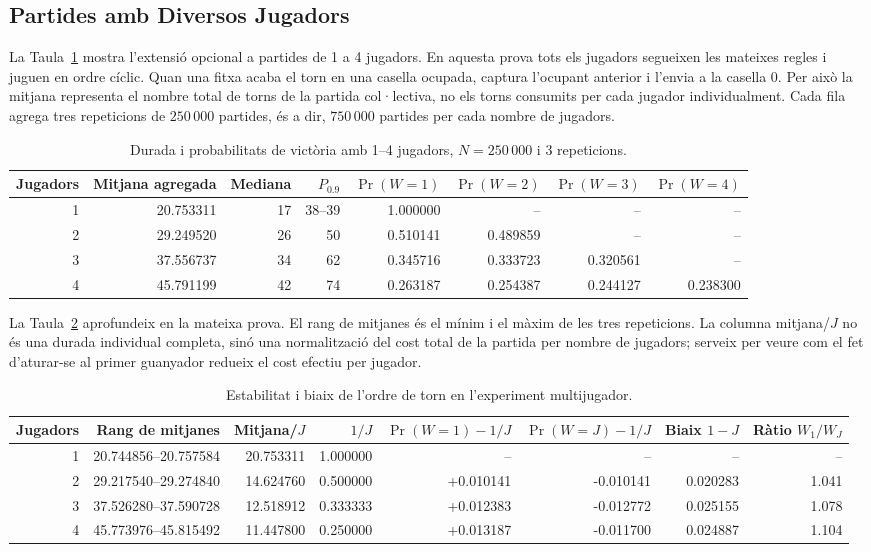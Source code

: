 \documentclass[conference,compsoc]{IEEEtran}
\begin{document}
\subsection{Partides amb Diversos Jugadors}

La Taula~\ref{tab:jugadors} mostra l'extensió opcional a partides de 1 a 4
jugadors. En aquesta prova tots els jugadors segueixen les mateixes regles i juguen
en ordre cíclic. Quan una fitxa acaba el torn en una casella ocupada, captura
l'ocupant anterior i l'envia a la casella 0. Per això la mitjana representa el
nombre total de torns de la partida col·lectiva, no els torns consumits per cada
jugador individualment. Cada fila agrega tres repeticions de $250\,000$ partides,
és a dir, $750\,000$ partides per cada nombre de jugadors.

\begin{table}[t]
\centering
\caption{Durada i probabilitats de victòria amb 1--4 jugadors, $N=250\,000$ i 3 repeticions.}
\label{tab:jugadors}
\footnotesize
\begin{tabular}{rrrrrrrr}
\toprule
Jugadors & Mitjana agregada & Mediana & $P_{0.9}$ & $\Pr(W=1)$ & $\Pr(W=2)$ & $\Pr(W=3)$ & $\Pr(W=4)$ \\
\midrule
1 & 20.753311 & 17 & 38--39 & 1.000000 & -- & -- & -- \\
2 & 29.249520 & 26 & 50 & 0.510141 & 0.489859 & -- & -- \\
3 & 37.556737 & 34 & 62 & 0.345716 & 0.333723 & 0.320561 & -- \\
4 & 45.791199 & 42 & 74 & 0.263187 & 0.254387 & 0.244127 & 0.238300 \\
\bottomrule
\end{tabular}
\end{table}

La Taula~\ref{tab:jugadors-biaix} aprofundeix en la mateixa prova. El rang de
mitjanes és el mínim i el màxim de les tres repeticions. La columna
mitjana/$J$ no és una durada individual completa, sinó una normalització del
cost total de la partida per nombre de jugadors; serveix per veure com el fet
d'aturar-se al primer guanyador redueix el cost efectiu per jugador.

\begin{table}[t]
\centering
\caption{Estabilitat i biaix de l'ordre de torn en l'experiment multijugador.}
\label{tab:jugadors-biaix}
\footnotesize
\begin{tabular}{rrrrrrrr}
\toprule
Jugadors & Rang de mitjanes & Mitjana/$J$ & $1/J$ & $\Pr(W=1)-1/J$ & $\Pr(W=J)-1/J$ & Biaix $1-J$ & Ràtio $W_1/W_J$ \\
\midrule
1 & 20.744856--20.757584 & 20.753311 & 1.000000 & -- & -- & -- & -- \\
2 & 29.217540--29.274840 & 14.624760 & 0.500000 & +0.010141 & -0.010141 & 0.020283 & 1.041 \\
3 & 37.526280--37.590728 & 12.518912 & 0.333333 & +0.012383 & -0.012772 & 0.025155 & 1.078 \\
4 & 45.773976--45.815492 & 11.447800 & 0.250000 & +0.013187 & -0.011700 & 0.024887 & 1.104 \\
\bottomrule
\end{tabular}
\end{table}
\end{document}
